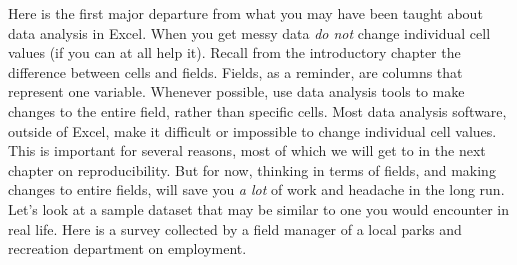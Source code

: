 \documentclass[]{book}
\newenvironment{Shaded}{\begin{snugshade}}{\end{snugshade}}
\newcommand{\DataTypeTok}[1]{\textcolor[rgb]{0.13,0.29,0.53}{#1}}
\newcommand{\KeywordTok}[1]{\textcolor[rgb]{0.13,0.29,0.53}{\textbf{#1}}}
\newcommand{\NormalTok}[1]{#1}
\newcommand{\OperatorTok}[1]{\textcolor[rgb]{0.81,0.36,0.00}{\textbf{#1}}}
\newcommand{\OtherTok}[1]{\textcolor[rgb]{0.56,0.35,0.01}{#1}}
\newcommand{\StringTok}[1]{\textcolor[rgb]{0.31,0.60,0.02}{#1}}
\begin{document}
Here is the first major departure from what you may have been taught about data analysis in Excel. When you get messy data \emph{do not} change individual cell values (if you can at all help it). Recall from the introductory chapter the difference between cells and fields. Fields, as a reminder, are columns that represent one variable. Whenever possible, use data analysis tools to make changes to the entire field, rather than specific cells. Most data analysis software, outside of Excel, make it difficult or impossible to change individual cell values. This is important for several reasons, most of which we will get to in the next chapter on reproducibility. But for now, thinking in terms of fields, and making changes to entire fields, will save you \emph{a lot} of work and headache in the long run. Let's look at a sample dataset that may be similar to one you would encounter in real life. Here is a survey collected by a field manager of a local parks and recreation department on employment.

\begin{Shaded}
\end{Shaded}
\end{document}
